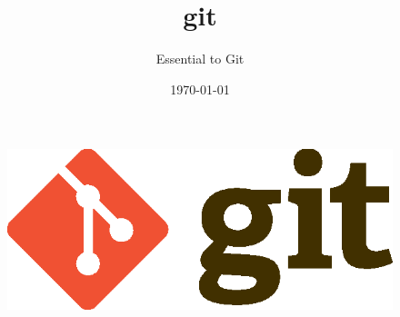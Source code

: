 \documentclass{beamer}
\title{git}
\subtitle{Essential to Git}
\date{\today}
\begin{document}
\begin{frame}
    \begin{figure}
        \center
        \includegraphics{git-logo.eps}
        \label{fig:git-logo}
    \end{figure}
\end{frame}
\end{document}
